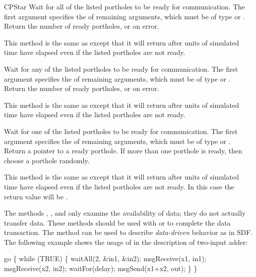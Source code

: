 \begin{indexlist}{CPStar}
Wait for all of the listed portholes to be ready for communication.
The first argument specifies the  of remaining arguments,
which must be of type  or .
Return the number of ready portholes, or  on error.

This method is the same as  except that it will return
after  units of simulated time have elapsed even if the
listed portholes are not ready.

Wait for any of the listed portholes to be ready for communication.
The first argument specifies the  of remaining arguments,
which must be of type  or .
Return the number of ready portholes, or  on error.

This method is the same as  except that it will return
after  units of simulated time have elapsed even if the
listed portholes are not ready.

Wait for one of the listed portholes to be ready for communication.
The first argument specifies the  of remaining arguments,
which must be of type  or .
Return a pointer to a ready porthole.  If more than one porthole is
ready, then choose a porthole randomly.

This method is the same as  except that it will return
after  units of simulated time have elapsed even if the
listed portholes are not ready.  In this case the return value will be
.

\end{indexlist}

The methods , , and  only
examine the availability of data; they do not actually
transfer data.  These methods should be used with  or
 to complete the data transaction.  The 
method can be used to describe \emph{data-driven} behavior as in SDF.
The following example shows the usage of  in the description
of two-input adder:

\begin{example}
go \{
    while (TRUE) \{
        waitAll(2, \&in1, \&in2);
        msgReceive(x1, in1);
        msgReceive(x2, in2);
        waitFor(delay);
        msgSend(x1+x2, out);
    \}
\}
\end{example}

